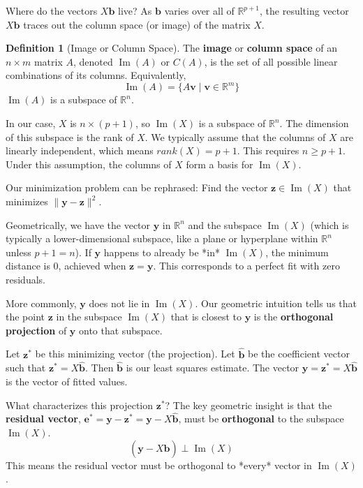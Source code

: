 \documentclass[11pt]{article}
\theoremstyle{definition}
\newtheorem{definition}[theorem]{Definition}
\DeclareMathOperator{\Image}{Im} %
\newcommand{\vect}[1]{\mathbf{#1}} %
\begin{document}
Where do the vectors $X\vect{b}$ live? As $\vect{b}$ varies over all of $\mathbb{R}^{p+1}$, the resulting vector $X\vect{b}$ traces out the column space (or image) of the matrix $X$.

\begin{definition}[Image or Column Space]
The \textbf{image} or \textbf{column space} of an $n \times m$ matrix $A$, denoted $\Image(A)$ or $C(A)$, is the set of all possible linear combinations of its columns. Equivalently,
\[ \Image(A) = \{ A\vect{v} \mid \vect{v} \in \mathbb{R}^m \} \]
$\Image(A)$ is a subspace of $\mathbb{R}^n$.
\end{definition}

In our case, $X$ is $n \times (p+1)$, so $\Image(X)$ is a subspace of $\mathbb{R}^n$. The dimension of this subspace is the rank of $X$. We typically assume that the columns of $X$ are linearly independent, which means $rank(X) = p+1$. This requires $n \ge p+1$. Under this assumption, the columns of $X$ form a basis for $\Image(X)$.

Our minimization problem can be rephrased:
Find the vector $\vect{z} \in \Image(X)$ that minimizes $\|\vect{y} - \vect{z}\|^2$.

Geometrically, we have the vector $\vect{y}$ in $\mathbb{R}^n$ and the subspace $\Image(X)$ (which is typically a lower-dimensional subspace, like a plane or hyperplane within $\mathbb{R}^n$ unless $p+1=n$). If $\vect{y}$ happens to already be *in* $\Image(X)$, the minimum distance is 0, achieved when $\vect{z} = \vect{y}$. This corresponds to a perfect fit with zero residuals.

More commonly, $\vect{y}$ does not lie in $\Image(X)$. Our geometric intuition tells us that the point $\vect{z}$ in the subspace $\Image(X)$ that is closest to $\vect{y}$ is the \textbf{orthogonal projection} of $\vect{y}$ onto that subspace.

Let $\vect{z}^*$ be this minimizing vector (the projection). Let $\hat{\vect{b}}$ be the coefficient vector such that $\vect{z}^* = X\hat{\vect{b}}$. Then $\hat{\vect{b}}$ is our least squares estimate. The vector $\hat{\vect{y}} = \vect{z}^* = X\hat{\vect{b}}$ is the vector of fitted values.

What characterizes this projection $\vect{z}^*$? The key geometric insight is that the \textbf{residual vector}, $\vect{e}^* = \vect{y} - \vect{z}^* = \vect{y} - X\hat{\vect{b}}$, must be \textbf{orthogonal} to the subspace $\Image(X)$.
\[ (\vect{y} - X\hat{\vect{b}}) \perp \Image(X) \]
This means the residual vector must be orthogonal to *every* vector in $\Image(X)$.
\end{document}
